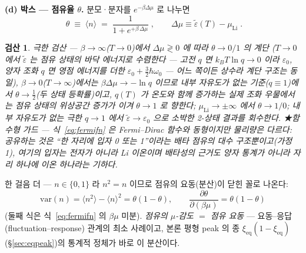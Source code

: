 \documentclass[11pt,a4paper]{article}
\newtheorem*{verifybox}{검산}
\newcommand{\eq}{\mathrm{eq}}
\begin{document}
\textbf{(d) 박스 --- 점유율 $\theta$.} 분모·분자를 $e^{-\beta\Delta\mu}$ 로 나누면
\begin{equation}
\boxed{\;\theta\;\equiv\;\langle n\rangle\;=\;\frac{1}{1+e^{+\beta\,\Delta\mu}}\;,
\qquad \Delta\mu\equiv\tilde\varepsilon(T)-\mu_\mathrm{Li}\;.}
\label{eq:fermifn}
\end{equation}
\begin{verifybox}
극한 검산 --- $\beta\to\infty$($T\to0$)에서 $\Delta\mu\gtrless0$ 에 따라 $\theta\to0/1$ 의 계단
($T\to0$ 에서 $\tilde\varepsilon$ 는 점유 상태의 바닥 에너지로 수렴한다 --- 고전 $q$ 면 $k_BT\ln q\to0$
이라 $\varepsilon_0$, 양자 조화 $q$ 면 영점 에너지를 더한 $\varepsilon_0+\tfrac32\hbar\omega_0$ --- 어느
쪽이든 상수라 계단 구조는 동일),
$\beta\to0$($T\to\infty$)에서는 $\beta\Delta\mu\to-\ln q$ 이므로 내부 자유도가 없는 기준($q\equiv1$)에서
$\theta\to\tfrac12$(두 상태 등확률)이고, $q(T)$ 가 온도와 함께 증가하는 실제 조화 우물에서는 점유 상태의
위상공간 증가가 이겨 $\theta\to1$ 로 향한다; $\mu_\mathrm{Li}\to\pm\infty$ 에서
$\theta\to1/0$; 내부 자유도가 없는 극한 $q\to1$ 에서 $\tilde\varepsilon\to\varepsilon_0$ 으로 소박한
2-상태 결과를 회수한다. ★함수형 가드 --- 식~\eqref{eq:fermifn} 은 Fermi--Dirac 함수와 \emph{동형}이지만
물리량은 다르다: 공유하는 것은 ``한 자리에 입자 0 또는 1''이라는 배타 점유의 대수 구조뿐이고(가정 1),
여기의 입자는 전자가 아니라 Li 이온이며 배타성의 근거도 양자 통계가 아니라 자리 하나에 이온 하나라는
기하다.
\end{verifybox}

한 걸음 더 --- $n\in\{0,1\}$ 라 $n^2=n$ 이므로 점유의 요동(분산)이 닫힌 꼴로 나온다:
\begin{equation}
\mathrm{var}(n)=\langle n^2\rangle-\langle n\rangle^2=\theta(1-\theta),
\qquad
\frac{\partial\theta}{\partial(\beta\mu)}=\theta(1-\theta)
\label{eq:sm-flucres}
\end{equation}
(둘째 식은 식~\eqref{eq:fermifn} 의 $\beta\mu$ 미분). \emph{점유의 $\mu$-감도 $=$ 점유 요동} --- 요동--응답
(fluctuation--response) 관계의 최소 사례이고, 본론 평형 peak 의 종 $\xi_\eq(1-\xi_\eq)$(\S\ref{sec:eqpeak})의
통계적 정체가 바로 이 분산이다.
\end{document}
